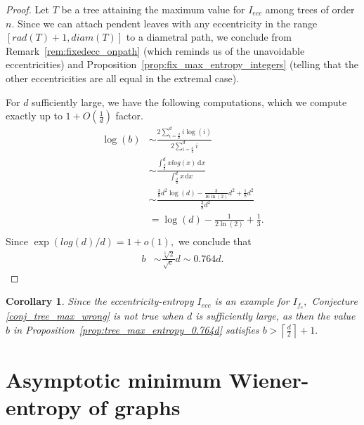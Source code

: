 \documentclass{article}
\newtheorem{cor}[defi]{Corollary}
\newcommand*{\bceil}[1]{\left\lceil #1\right\rceil}
\def \d{\, \mathrm{d}}
\newcommand{\diam}{diam}
\newcommand{\rad}{rad}
\begin{document}
{\begin{proof}

Let $T$ be a tree attaining the maximum value for $I_{ecc}$ among trees of order $n$. 
Since we can attach pendent leaves with any eccentricity in the range $[\rad(T)+1, \diam(T)]$ to a diametral path, we conclude from Remark~\ref{rem:fixedecc_onpath} (which reminds us of the unavoidable eccentricities) and Proposition~\ref{prop:fix_max_entropy_integers} (telling that the other eccentricities are all equal in the extremal case). 


For $d$ sufficiently large, we have the following computations, which we compute exactly up to $1+O\left( \frac 1d \right)$ factor.
\begin{align*}
    \log(b) &\sim \frac{2\sum_{i=\frac{d}{2}}^{d}i\log (i)}{2\sum_{i=\frac{d}{2}}^{d}i}\\
    &\sim  \frac{\int_{\frac{d}{2}}^{d} x log (x) \d x}{\int_{\frac{d}{2}}^{d} x \d x}\\
    &\sim \frac{ \frac 38 d^2 \log (d) - \frac 3 {16\ln(2)} d^2 +\frac{1}{8}d^2}{\frac 38 d^2} \\
    &= \log (d) - \frac {1}{2\ln(2)} +\frac{1}{3}.\\
\end{align*}
Since $\exp( log(d)/d)=1+o(1), $ we conclude that 
\begin{align*}
b&\sim  \frac{\sqrt[3]{2}}{\sqrt{e}}d \sim 0.764 d.
\end{align*}
\end{proof}

\begin{cor}
    Since the eccentricity-entropy $I_{ecc}$ is an example for $I_{f_{e}},$
    Conjecture \ref{conj_tree_max_wrong} is not true when $d$ is sufficiently large, as then the value $b$ in Proposition~\ref{prop:tree_max_entropy_0.764d} satisfies $b> \bceil{\frac{d}{2}}+1.$
\end{cor}












\section{Asymptotic minimum Wiener-entropy of graphs}\label{sec:asminIw} %

}
\end{document}
